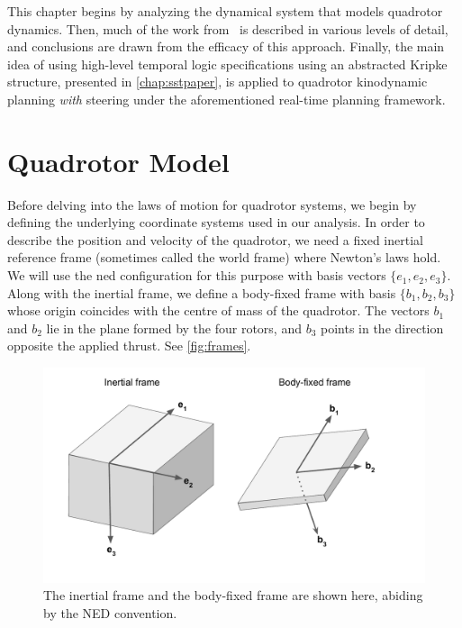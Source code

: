 This chapter begins by analyzing the dynamical system that models quadrotor dynamics. Then, much of the work from~\cite{Allen2016} is described in various levels of detail, and conclusions are drawn from the efficacy of this approach. Finally, the main idea of using high-level temporal logic specifications using an abstracted Kripke structure, presented in \autoref{chap:sstpaper}, is applied to quadrotor kinodynamic planning \emph{with} steering under the aforementioned real-time planning framework.

\section{Quadrotor Model}

Before delving into the laws of motion for quadrotor systems, we begin by defining the underlying coordinate systems used in our analysis. In order to describe the position and velocity of the quadrotor, we need a fixed inertial reference frame (sometimes called the world frame) where Newton's laws hold. We will use the \gls{ned} configuration for this purpose with basis vectors $\{e_1, e_2, e_3 \}$. Along with the inertial frame, we define a body-fixed frame with basis $\{b_1, b_2, b_3\}$ whose origin coincides with the centre of mass of the quadrotor. The vectors $b_1$ and $b_2$ lie in the plane formed by the four rotors, and $b_3$ points in the direction opposite the applied thrust. See \autoref{fig:frames}.

\begin{figure}[h]
    \centering
    \includegraphics[scale=0.54]{./figures/frames}
    \caption[Inertial and body-fixed frames]{The inertial frame and the body-fixed frame are shown here, abiding by the NED convention.}
\label{fig:frames}
\end{figure}

